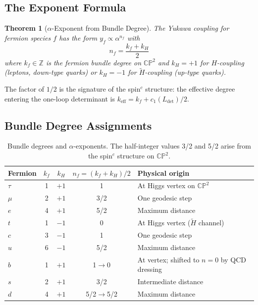 \documentclass[11pt,a4paper]{article}
\newcommand{\CP}{\mathbb{CP}}
\newcommand{\Z}{\mathbb{Z}}
\newtheorem{theorem}{Theorem}
\begin{document}
\subsection{The Exponent Formula}

\begin{theorem}[$\alpha$-Exponent from Bundle Degree]
\label{thm:exponent}
The Yukawa coupling for fermion species $f$ has the form $y_f \propto \alpha^{n_f}$
with
\begin{equation}
\boxed{\quad n_f = \frac{k_f + k_H}{2}\quad}
\label{eq:exponent}
\end{equation}
where $k_f\in\Z$ is the fermion bundle degree on $\CP^2$ and
$k_H = +1$ for $H$-coupling (leptons, down-type quarks) or $k_H = -1$
for $\widetilde{H}$-coupling (up-type quarks).
\end{theorem}

The factor of $1/2$ is the signature of the spin$^c$ structure: the effective
degree entering the one-loop determinant is $k_{\text{eff}} = k_f + c_1(L_{\det})/2$.

\subsection{Bundle Degree Assignments}

\begin{table}[h]
\centering
\renewcommand{\arraystretch}{1.15}
\begin{tabular}{lcccl}
\toprule
Fermion & $k_f$ & $k_H$ & $n_f = (k_f+k_H)/2$ & Physical origin \\
\midrule
$\tau$  & 1 & $+1$ & 1   & At Higgs vertex on $\CP^2$ \\
$\mu$   & 2 & $+1$ & 3/2 & One geodesic step \\
$e$     & 4 & $+1$ & 5/2 & Maximum distance \\
$t$     & 1 & $-1$ & 0   & At Higgs vertex ($\widetilde{H}$ channel) \\
$c$     & 3 & $-1$ & 1   & One geodesic step \\
$u$     & 6 & $-1$ & 5/2 & Maximum distance \\
$b$     & 1 & $+1$ & 1$\to$0  & At vertex; shifted to $n=0$ by QCD dressing \\
$s$     & 2 & $+1$ & 3/2 & Intermediate distance \\
$d$     & 4 & $+1$ & 5/2$\to$5/2 & Maximum distance \\
\bottomrule
\end{tabular}
\caption{Bundle degrees and $\alpha$-exponents.  The half-integer values 3/2 and 5/2
arise from the spin$^c$ structure on $\CP^2$.}
\label{tab:bundles}
\end{table}
\end{document}
